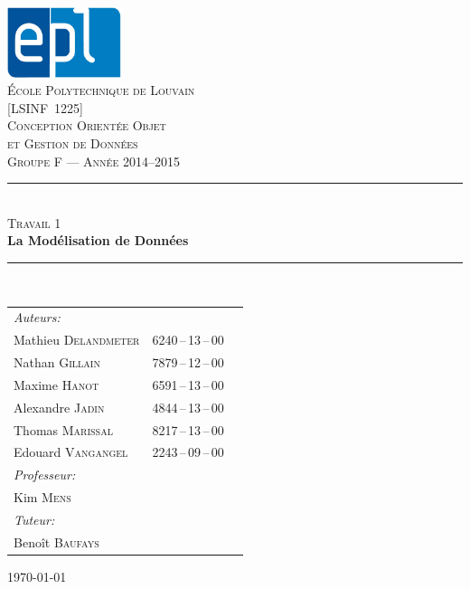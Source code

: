 \documentclass[11pt, a4, oneside, headings=normal]{scrreprt}
\newcommand{\HRule}{\rule{\linewidth}{0.5mm}}
\begin{document}

\begin{titlepage}
\begin{center}

\includegraphics[width=0.25\textwidth]{epl-logo}~\\[0.4cm]

\textsc{\LARGE École Polytechnique de Louvain}\\[1.2cm]
\textsc{\Large [LSINF~1225]}\\[0.05cm]
\textsc{\Large Conception Orientée Objet }\\[0.1cm]
\textsc{\Large et Gestion de Données}\\[1.0cm]


\textsc{\Large Groupe F --- Année 2014--2015}\\[0.8cm]

\HRule \\[0.5cm]
\textsc{\LARGE  Travail 1}\\[0.1cm]
{ \huge \bfseries La Modélisation de Données \\[0.3cm] }

\HRule \\[0.6cm]

{\large
\begin{tabu} to 0.7\linewidth {Xll}
    \emph{Auteurs:}\\
    \quad Mathieu \textsc{Delandmeter} & 6240\,--\,13\,--\,00\\
    \quad Nathan \textsc{Gillain} & 7879\,--\,12\,--\,00\\
    \quad Maxime \textsc{Hanot} & 6591\,--\,13\,--\,00\\
    \quad Alexandre \textsc{Jadin} & 4844\,--\,13\,--\,00\\
    \quad Thomas \textsc{Marissal} & 8217\,--\,13\,--\,00\\
    \quad Edouard \textsc{Vangangel} & 2243\,--\,09\,--\,00\\[.5ex]   
    \emph{Professeur:} \\
    \quad Kim \textsc{Mens}\\[.5ex]
    \emph{Tuteur:}\\
    \quad Benoît \textsc{Baufays}\\
\end{tabu}
}

\vfill

{\large \today}

\end{center}
\end{titlepage}
\end{document}
